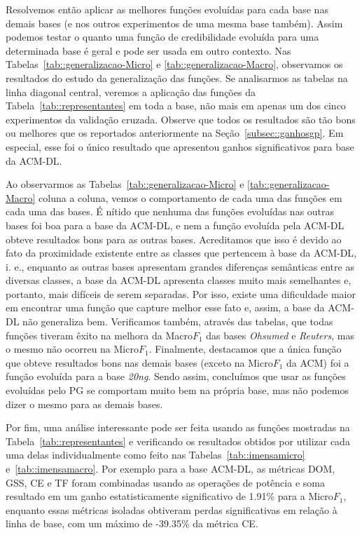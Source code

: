 Resolvemos então aplicar as melhores funções evoluídas para cada base nas demais bases (e nos outros experimentos de uma mesma base também). Assim podemos testar o quanto uma função de credibilidade evoluída para uma determinada base é geral e pode ser usada em outro contexto. Nas Tabelas~\ref{tab::generalizacao-Micro} e \ref{tab::generalizacao-Macro}, observamos os resultados do estudo da generalização das funções. Se analisarmos as tabelas na linha diagonal central, veremos a aplicação das funções da Tabela~\ref{tab::representantes} em toda a base, não mais em apenas um dos cinco experimentos da validação cruzada. Observe que todos os resultados são tão bons ou melhores que os reportados anteriormente na Seção~\ref{subsec::ganhosgp}. Em especial, esse foi o único resultado que apresentou ganhos significativos para base da \textsc{ACM-DL}.

Ao observarmos as Tabelas~\ref{tab::generalizacao-Micro} e \ref{tab::generalizacao-Macro} coluna a coluna, vemos o comportamento de cada uma das funções em cada uma das bases. É nítido que nenhuma das funções evoluídas nas outras bases foi boa para a base da \textsc{ACM-DL}, e nem a função evoluída pela \textsc{ACM-DL} obteve resultados bons para as outras bases.
Acreditamos que isso é devido ao fato da proximidade existente entre as classes que pertencem à base da \textsc{ACM-DL}, i. e., enquanto as outras bases apresentam grandes diferenças semânticas entre as diversas classes, a base da \textsc{ACM-DL} apresenta classes muito mais semelhantes e, portanto, mais difíceis de serem separadas. Por isso, existe uma dificuldade maior em encontrar uma função que capture melhor esse fato e, assim, a base da \textsc{ACM-DL} não generaliza bem.
Verificamos também, através das tabelas, que todas funções tiveram êxito na melhora da Macro$F_1$ das bases \textit{Ohsumed} e \textit{Reuters}, mas o mesmo não ocorreu na Micro$F_1$.
Finalmente, destacamos que a única função que obteve resultados bons nas demais bases (exceto na Micro$F_1$ da \textsc{ACM}) foi a função evoluída para a base \textit{20ng}.
Sendo assim, concluímos que usar as funções evoluídas pelo \textsc{PG} se comportam muito bem na própria base, mas não podemos dizer o mesmo para as demais bases.

Por fim, uma análise interessante pode ser feita usando as funções mostradas na Tabela~\ref{tab::representantes} e verificando os resultados obtidos por utilizar cada uma delas individualmente como feito nas Tabelas~\ref{tab::imensamicro} e~\ref{tab::imensamacro}. Por exemplo para a base \textsc{ACM-DL}, as métricas \textsc{DOM}, \textsc{GSS}, \textsc{CE} e \textsc{TF} foram combinadas usando as operações de potência e soma resultado em um ganho estatisticamente significativo de 1.91\% para a Micro$F_1$, enquanto essas métricas isoladas obtiveram perdas significativas em relação à linha de base, com um máximo de -39.35\% da métrica \textsc{CE}.



